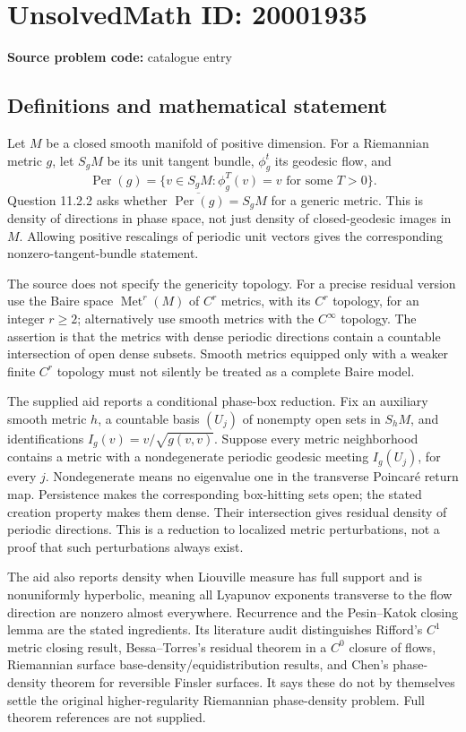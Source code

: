 \documentclass[11pt]{article}
\begin{document}
\section*{UnsolvedMath ID: 20001935}
\textbf{Source problem code:} catalogue entry
\subsection{Definitions and mathematical statement}
Let \(M\) be a closed smooth manifold of positive dimension. For a Riemannian metric \(g\), let \(S_gM\) be its unit tangent bundle, \(\phi_g^t\) its geodesic flow, and
\[
\operatorname{Per}(g)=\{v\in S_gM:\phi_g^T(v)=v\text{ for some }T>0\}.
\]
Question 11.2.2 asks whether \(\overline{\operatorname{Per}(g)}=S_gM\) for a generic metric. This is density of directions in phase space, not just density of closed-geodesic images in \(M\). Allowing positive rescalings of periodic unit vectors gives the corresponding nonzero-tangent-bundle statement.

The source does not specify the genericity topology. For a precise residual version use the Baire space \(\operatorname{Met}^r(M)\) of \(C^r\) metrics, with its \(C^r\) topology, for an integer \(r\geq2\); alternatively use smooth metrics with the \(C^\infty\) topology. The assertion is that the metrics with dense periodic directions contain a countable intersection of open dense subsets. Smooth metrics equipped only with a weaker finite \(C^r\) topology must not silently be treated as a complete Baire model.

The supplied aid reports a conditional phase-box reduction. Fix an auxiliary smooth metric \(h\), a countable basis \((U_j)\) of nonempty open sets in \(S_hM\), and identifications \(I_g(v)=v/\sqrt{g(v,v)}\). Suppose every metric neighborhood contains a metric with a nondegenerate periodic geodesic meeting \(I_g(U_j)\), for every \(j\). Nondegenerate means no eigenvalue one in the transverse Poincar\'e return map. Persistence makes the corresponding box-hitting sets open; the stated creation property makes them dense. Their intersection gives residual density of periodic directions. This is a reduction to localized metric perturbations, not a proof that such perturbations always exist.

The aid also reports density when Liouville measure has full support and is nonuniformly hyperbolic, meaning all Lyapunov exponents transverse to the flow direction are nonzero almost everywhere. Recurrence and the Pesin--Katok closing lemma are the stated ingredients. Its literature audit distinguishes Rifford's \(C^1\) metric closing result, Bessa--Torres's residual theorem in a \(C^0\) closure of flows, Riemannian surface base-density/equidistribution results, and Chen's phase-density theorem for reversible Finsler surfaces. It says these do not by themselves settle the original higher-regularity Riemannian phase-density problem. Full theorem references are not supplied.
\end{document}
